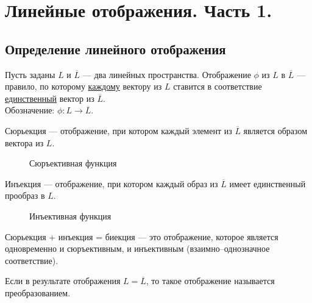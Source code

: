 \chapter{Линейные отображения. Часть 1.}
\section{Определение линейного отображения}
\begin{definition}
	Пусть заданы $L$ и $\overline{L}$ --- два линейных пространства. \textsf{Отображение} $\phi$ из $L$ в $\overline{L}$ --- правило, по которому \underline{каждому} вектору из $L$ ставится в соответствие \underline{единственный} вектор из $\overline{L}$.\\
	Обозначение: $\phi: L\rightarrow\overline{L}$.
\end{definition}

\begin{definition}
	\textsf{Сюрьекция} --- отображение, при котором каждый элемент из $\overline{L}$ является образом вектора из $L$.
\end{definition}

\begin{figure}[h!]
	\centering
	\def\svgwidth{5cm} %
	
	\caption{Сюръективная функция}
	\label{...}
\end{figure}

\begin{definition}
	\textsf{Инъекция} --- отображение, при котором каждый образ из $\overline{L}$ имеет единственный прообраз в $L$.
\end{definition}

\begin{figure}[h!]
	\centering
	\def\svgwidth{5cm} %
	
	\caption{Инъективная функция}
	\label{...}
\end{figure}

\begin{definition}
	Сюрьекция + инъекция = \textsf{биекция} --- это отображение, которое является одновременно и сюръективным, и инъективным (взаимно--однозначное соответствие).
\end{definition}

\begin{definition}
	Если в результате отображения $L=\overline{L}$, то такое отображение называется \textsf{преобразованием}.
\end{definition}

